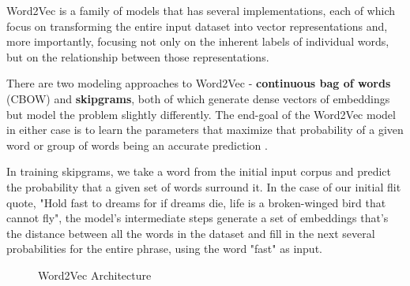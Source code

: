 \documentclass[11pt, table]{diazessay} %
\begin{document}
\begin{sloppypar}
Word2Vec is a family of models that has several implementations, each of which focus on transforming the entire input dataset into vector representations and, more importantly, focusing  not only on the inherent labels of individual words, but on the relationship between those representations.

There are two modeling approaches to Word2Vec - \textbf{continuous bag of words} (CBOW) and \textbf{skipgrams}, both of which generate dense vectors of embeddings but model the problem slightly differently. The end-goal of the Word2Vec model in either case is to learn the parameters that maximize that probability of a given word or group of words being an accurate prediction  \citep{goldberg2014word2vec}.

In training skipgrams, we take a word from the initial input corpus and predict the probability that a given set of words surround it. In the case of our initial flit quote, "Hold fast to dreams for if dreams die, life is a broken-winged bird that cannot fly", the model's intermediate steps generate a set of embeddings that's the distance between all the words in the dataset and fill in the next several probabilities for the entire phrase, using the word "fast" as input.  

\begin{figure}[H]
   	 \caption{Word2Vec Architecture}
      \end{figure}


\end{sloppypar}
\end{document}
